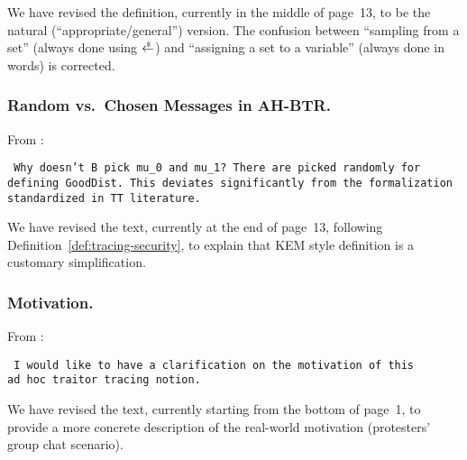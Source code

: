 We have revised the definition,
currently in the middle of page~13,
to be the natural (``appropriate/general'') version.
The confusion between
``sampling from a set'' (always done using $\draws$) and
``assigning a set to a variable'' (always done in words) is corrected.

\subsubsection{Random vs.\ Chosen Messages in AH-BTR.}
From :

\texttt{
Why doesn't B pick mu\_0 and mu\_1? There are picked randomly for \\
defining GoodDist. This deviates significantly from the formalization \\
standardized in TT literature.
}

We have revised the text, currently at the end of page~13,
following Definition~\ref{def:tracing-security},
to explain that KEM style definition is a customary simplification.

\subsubsection{Motivation.}
From :

\texttt{
I would like to have a clarification on the motivation of this \\
ad hoc traitor tracing notion.
}

We have revised the text, currently starting from the bottom of page~1,
to provide a more concrete description of the real-world motivation
(protesters' group chat scenario).



 
 

